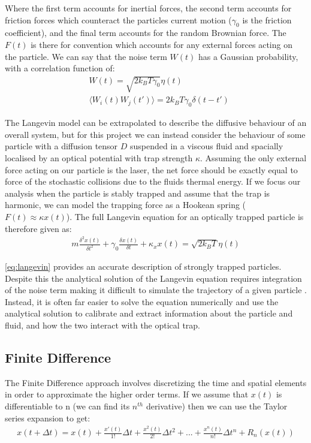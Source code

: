 Where the first term accounts for inertial forces, the second term accounts 
for friction forces which counteract the particles current motion ($\gamma_0$ 
is the friction coefficient), and the final term accounts for the random 
Brownian force. The $F(t)$ is there for convention which accounts for any 
external forces acting on the particle. We can say that the noise term 
$W(t)$ has a Gaussian probability, with a correlation function of:
\begin{align}
	&W(t) = \sqrt{2k_BT\gamma_0}\eta(t) \\
	&\langle W_i(t)W_j(t')\rangle = 2k_BT\gamma_0\delta(t-t')
\end{align}

The Langevin model can be extrapolated to describe the diffusive behaviour 
of an overall system, but for this project we can instead consider the 
behaviour of some particle with a diffusion tensor $D$ suspended in a 
viscous fluid and spacially localised by an optical potential with trap 
strength $\kappa$. Assuming the only external force acting on our particle 
is the laser, the net force should be exactly equal to force of the stochastic
collisions due to the fluids thermal energy. If we focus our analysis when 
the particle is stably trapped and assume that the trap is harmonic, we can 
model the trapping force as a Hookean spring ($F(t) \approx \kappa x(t)$). 
The full Langevin equation for an optically trapped particle is therefore given as:
\begin{align}
	\label{eq:langevin}
	m\frac{\delta^2x(t)}{\delta t^2} + \gamma_0 \frac{\delta x(t)}{\delta t} + \kappa_x x(t) = \sqrt{2k_BT}\eta(t)
\end{align}

\eqref{eq:langevin} provides an accurate description of strongly trapped 
particles. Despite this the analytical solution of the Langevin equation requires 
integration of the noise term making it difficult to simulate the 
trajectory of a given particle \cite{Volpe2013}. Instead, it is often far 
easier to solve the equation numerically and use the analytical 
solution to calibrate and extract information about the particle and fluid, 
and how the two interact with the optical trap.

\subsection{Finite Difference}
The Finite Difference approach involves discretizing the time and spatial 
elements in order to approximate the higher order terms. If we assume that 
$x(t)$ is differentiable to n (we can find its $n^{th}$ derivative) then 
we can use the Taylor series expansion to get:
\begin{align}
	x(t+\Delta t) = x(t)+\frac{x'(t)}{1!}\Delta t + \frac{x^2(t)}{2!}\Delta t^2+...+\frac{x^n(t)}{n!}\Delta t^n+R_n(x(t))	
\end{align}


